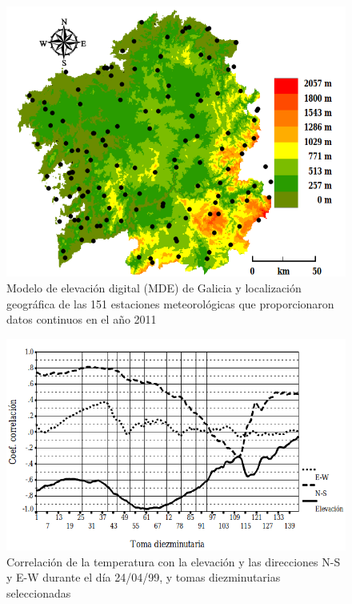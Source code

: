\begin{figure}
    \centering
    \includegraphics[scale=0.4]{proyectos/proyecto_geoestadistica_croacia/images/ea_galicia.png}
    \caption{Modelo de elevación digital (MDE) de Galicia y localización geográfica de las 151 estaciones meteorológicas que proporcionaron datos continuos en el año 2011}
    \label{ea_galicia}
\end{figure}


\begin{figure}
    \centering
    \includegraphics[scale=0.4]{proyectos/proyecto_geoestadistica_croacia/images/ea_henao_i.png}
    \caption{Correlación de la temperatura con la elevación y las direcciones N-S y E-W durante el día 24/04/99, y tomas diezminutarias seleccionadas}
    \label{ea_hernan_i}
\end{figure}


